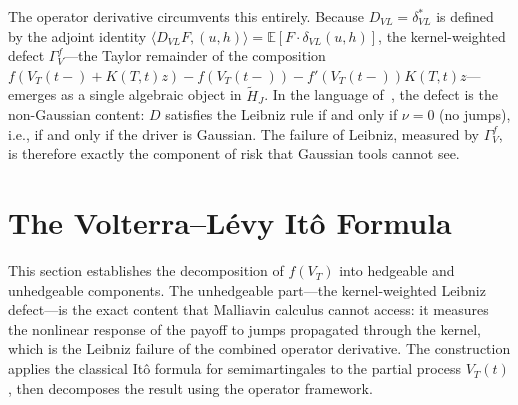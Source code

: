\documentclass[11pt,a4paper]{article}
\theoremstyle{plain}
\theoremstyle{definition}
\theoremstyle{remark}
\begin{document}
The operator derivative circumvents this entirely.  Because
$D_{VL} = \delta_{VL}^*$ is defined by the adjoint identity
$\langle D_{VL} F, (u,h) \rangle = \mathbb{E}[F \cdot
\delta_{VL}(u,h)]$, the kernel-weighted defect
$\Gamma_V^f$---the Taylor remainder of the composition
$f(V_T(t\!-\!) + K(T,t)z) - f(V_T(t\!-\!))
- f'(V_T(t\!-\!))K(T,t)z$---emerges as a single algebraic
object in $\widetilde{H}_J$.  In the language
of~\cite{Fontes2026d}, the defect is the non-Gaussian content:
$D$ satisfies the Leibniz rule if and only if $\nu = 0$
(no jumps), i.e., if and only if the driver is Gaussian.
The failure of Leibniz, measured by $\Gamma_V^f$, is therefore
exactly the component of risk that Gaussian tools cannot see.


\section{The Volterra--L\'evy It\^o Formula}\label{sec:ito}

This section establishes the decomposition of $f(V_T)$ into
hedgeable and unhedgeable components.  The unhedgeable
part---the kernel-weighted Leibniz defect---is the exact
content that Malliavin calculus cannot access: it measures
the nonlinear response of the payoff to jumps propagated
through the kernel, which is the Leibniz failure of the
combined operator derivative.  The construction applies the
classical It\^o formula for semimartingales to the partial
process $V_T(t)$, then decomposes the result using the
operator framework.
\end{document}
